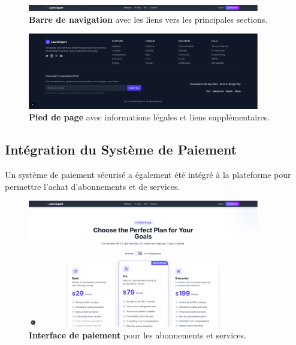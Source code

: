 \begin{figure}[h!]
  \centering
  \includegraphics[width=0.9\textwidth,keepaspectratio]{week_2_img/navbar.png}
  \caption{\textbf{Barre de navigation} avec les liens vers les principales sections.}
  \label{fig:navbar}
\end{figure}

\begin{figure}[h!]
  \centering
  \includegraphics[width=0.9\textwidth,keepaspectratio]{week_2_img/foter.png}
  \caption{\textbf{Pied de page} avec informations légales et liens supplémentaires.}
  \label{fig:footer}
\end{figure}

\subsection{Intégration du Système de Paiement}
Un système de paiement sécurisé a également été intégré à la plateforme pour permettre l'achat d'abonnements et de services.

\begin{figure}[h!]
  \centering
  \includegraphics[width=0.9\textwidth,keepaspectratio]{week_2_img/payment_1.png}
  \caption{\textbf{Interface de paiement} pour les abonnements et services.}
  \label{fig:payment}
\end{figure}

